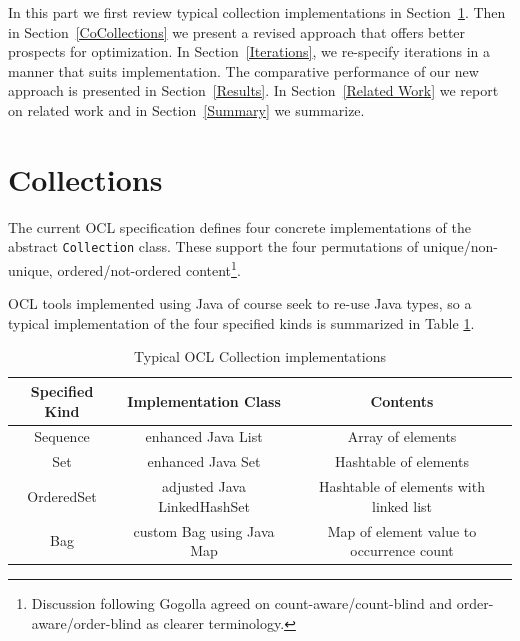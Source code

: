 \documentclass[
]{ceurart}
\begin{document}

In this part we first review typical collection implementations in Section~\ref{Collections}. Then in Section~\ref{CoCollections} we present a revised approach that offers better prospects for optimization. In Section~\ref{Iterations}, we re-specify iterations in a manner that suits implementation. The comparative performance of our new approach is presented in Section~\ref{Results}. In Section~\ref{Related Work} we report on related work and in Section~\ref{Summary} we summarize.

\section{Collections}\label{Collections}

The current OCL specification defines four concrete implementations of the abstract \verb!Collection! class. 
These support the four permutations of unique/non-unique, ordered/not-ordered content\footnote{Discussion following Gogolla \cite{gogolla2021refactoring} agreed on count-aware/count-blind and order-aware/order-blind as clearer terminology.}.

OCL tools implemented using Java of course seek to re-use Java types, so a typical implementation of the four specified kinds is summarized in Table \ref{tab:TypicalOCLCollection}.

\begin{table}[h]
\begin{tabular}{ c | c | c }
Specified Kind & Implementation Class & Contents \\
\hline
Sequence &  enhanced Java List & Array of elements \\
Set &  enhanced Java Set & Hashtable of elements \\
OrderedSet & adjusted Java LinkedHashSet & Hashtable of elements with linked list \\
Bag &  custom Bag using Java Map & Map of element value to occurrence count \\
\end{tabular}
\caption{Typical OCL Collection implementations}
\label{tab:TypicalOCLCollection}
\end{table}
\end{document}

